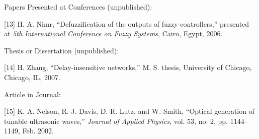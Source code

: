 Papers Presented at Conferences (unpublished):

[13] H. A. Nimr, ``Defuzzification of the outputs of fuzzy
controllers,'' presented at {\em 5th International Conference on
Fuzzy Systems}, Cairo, Egypt, 2006.

Thesis or Dissertation (unpublished):

[14] H. Zhang, ``Delay-insensitive networks,'' M. S. thesis,
University of Chicago, Chicago, IL, 2007.

Article in Journal:

[15] K. A. Nelson, R. J. Davis, D. R. Lutz, and W. Smith,
``Optical generation of tunable ultrasonic waves,'' {\em Journal of
Applied Physics}, vol. 53, no. 2, pp. 1144–1149, Feb. 2002.

